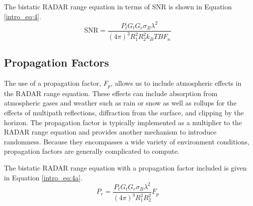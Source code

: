 The bistatic RADAR range equation in terms of SNR is shown in Equation \ref{intro_eq:4}.
\begin{equation}
    \label{intro_eq:4}
\text{SNR} = \frac{P_tG_tG_r\sigma_B\lambda^2}{\left(4\pi\right)^3 R_1^2R_2^2k_BTBF_n}
\end{equation}

\subsection{Propagation Factors}
The use of a propagation factor, $F_p$, allows us to include atmospheric effects in the RADAR range equation. These effects can include absorption from atmospheric gases and weather such as rain or snow as well as rollups for the effects of multipath reflections, diffraction from the surface, and clipping by the horizon. The propagation factor is typically implemented as a multiplier to the RADAR range equation and provides another mechanism to introduce randomness. Because they encompasses a wide variety of environment conditions, propagation factors are generally complicated to compute. 

The bistatic RADAR range equation with a propagation factor included is given in Equation \ref{intro_eq:4a}.
  \begin{equation}
  \label{intro_eq:4a}
 P_r = \frac{P_tG_tG_r\sigma_B\lambda^2}{\left(4\pi\right)^3R_1^2R_2^2}F_p
  \end{equation}
  
